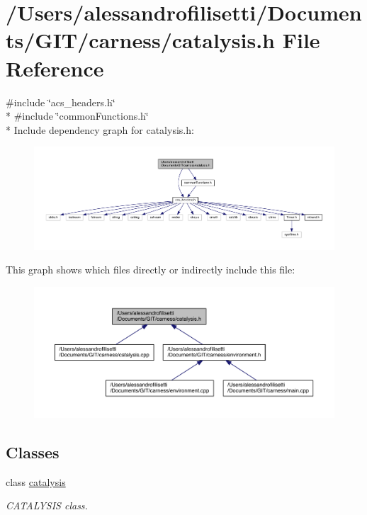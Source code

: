 \hypertarget{a00055}{\section{/\+Users/alessandrofilisetti/\+Documents/\+G\+I\+T/carness/catalysis.h File Reference}
\label{a00055}
}
{\ttfamily \#include \char`\"{}acs\+\_\+headers.\+h\char`\"{}}\\*
{\ttfamily \#include \char`\"{}common\+Functions.\+h\char`\"{}}\\*
Include dependency graph for catalysis.\+h\+:\nopagebreak
\begin{figure}[H]
\begin{center}
\leavevmode
\includegraphics[width=350pt]{a00170}
\end{center}
\end{figure}
This graph shows which files directly or indirectly include this file\+:\nopagebreak
\begin{figure}[H]
\begin{center}
\leavevmode
\includegraphics[width=350pt]{a00171}
\end{center}
\end{figure}
\subsection*{Classes}
\begin{DoxyCompactItemize}
\item 
class \hyperlink{a00011}{catalysis}
\begin{DoxyCompactList}\small\item\em C\+A\+T\+A\+L\+Y\+S\+I\+S class. \end{DoxyCompactList}\end{DoxyCompactItemize}
